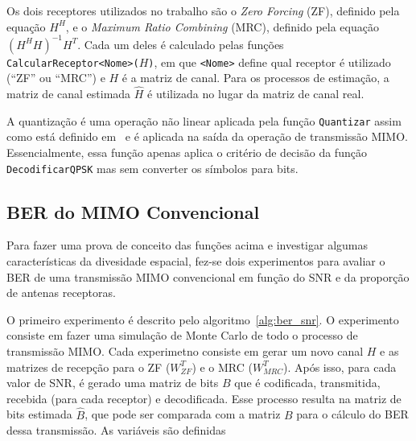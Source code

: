 \documentclass{article}
\begin{document}
Os dois receptores utilizados no trabalho são o \textit{Zero Forcing} (ZF), definido pela equação $H^{H}$, e o \textit{Maximum Ratio Combining} (MRC), definido pela equação $(H^HH)^{-1}H^T$. Cada um deles é calculado pelas funções \texttt{CalcularReceptor<Nome>($H$)}, em que \texttt{<Nome>} define qual receptor é utilizado (``ZF'' ou ``MRC'') e $H$ é a matriz de canal. Para os processos de estimação, a matriz de canal estimada $\hat{H}$ é utilizada no lugar da matriz de canal real.

A quantização é uma operação não linear aplicada pela função \texttt{Quantizar} assim como está definido em~\cite[eq. 2]{li.etal_2017a} e é aplicada na saída da operação de transmissão MIMO. Essencialmente, essa função apenas aplica o critério de decisão da função \texttt{DecodificarQPSK} mas sem converter os símbolos para bits. 

\subsection{BER do MIMO Convencional}

Para fazer uma prova de conceito das funções acima e investigar algumas características da divesidade espacial, fez-se dois experimentos para avaliar o BER de uma transmissão MIMO convencional em função do SNR e da proporção de antenas receptoras. 

O primeiro experimento é descrito pelo algoritmo~\ref{alg:ber_snr}. O experimento consiste em fazer uma simulação de Monte Carlo de todo o processo de transmissão MIMO. Cada experimetno consiste em gerar um novo canal $H$ e as matrizes de recepção para o ZF ($W^T_{ZF}$) e o MRC ($W^T_{MRC}$). Após isso, para cada valor de SNR, é gerado uma matriz de bits $B$ que é codificada, transmitida, recebida (para cada receptor) e decodificada. Esse processo resulta na matriz de bits estimada $\hat{B}$, que pode ser comparada com a matriz $B$ para o cálculo do BER dessa transmissão. As variáveis são definidas 
\end{document}
